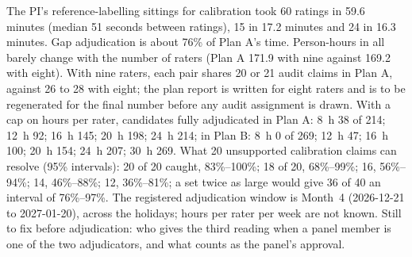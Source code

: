 \documentclass{article} %
\begin{document}
The PI's reference-labelling sittings for calibration took 60 ratings in 59.6 minutes (median 51 seconds between ratings), 15 in 17.2 minutes and 24 in 16.3 minutes. Gap adjudication is about 76\% of Plan A's time. Person-hours in all barely change with the number of raters (Plan A 171.9 with nine against 169.2 with eight). With nine raters, each pair shares 20 or 21 audit claims in Plan A, against 26 to 28 with eight; the plan report is written for eight raters and is to be regenerated for the final number before any audit assignment is drawn. With a cap on hours per rater, candidates fully adjudicated in Plan A: 8~h 38 of 214; 12~h 92; 16~h 145; 20~h 198; 24~h 214; in Plan B: 8~h 0 of 269; 12~h 47; 16~h 100; 20~h 154; 24~h 207; 30~h 269. What 20 unsupported calibration claims can resolve (95\% intervals): 20 of 20 caught, 83\%--100\%; 18 of 20, 68\%--99\%; 16, 56\%--94\%; 14, 46\%--88\%; 12, 36\%--81\%; a set twice as large would give 36 of 40 an interval of 76\%--97\%. The registered adjudication window is Month~4 (2026-12-21 to 2027-01-20), across the holidays; hours per rater per week are not known. Still to fix before adjudication: who gives the third reading when a panel member is one of the two adjudicators, and what counts as the panel's approval.

\FloatBarrier
\end{document}
